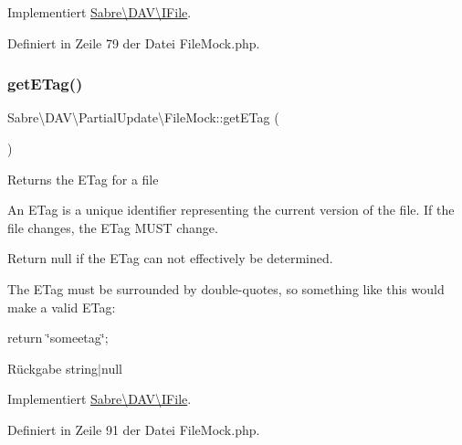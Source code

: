 Implementiert \mbox{\hyperlink{interface_sabre_1_1_d_a_v_1_1_i_file_aa76147e3e0ad228026dcb03035b499bc}{Sabre\textbackslash{}\+D\+A\+V\textbackslash{}\+I\+File}}.



Definiert in Zeile 79 der Datei File\+Mock.\+php.

\mbox{\label{class_sabre_1_1_d_a_v_1_1_partial_update_1_1_file_mock_ac3cb7c33686234052db8f3b870822cc9}} 
\subsubsection{\texorpdfstring{get\+E\+Tag()}{getETag()}}
{\footnotesize\ttfamily Sabre\textbackslash{}\+D\+A\+V\textbackslash{}\+Partial\+Update\textbackslash{}\+File\+Mock\+::get\+E\+Tag (\begin{DoxyParamCaption}{ }\end{DoxyParamCaption})}

Returns the E\+Tag for a file

An E\+Tag is a unique identifier representing the current version of the file. If the file changes, the E\+Tag M\+U\+ST change.

Return null if the E\+Tag can not effectively be determined.

The E\+Tag must be surrounded by double-\/quotes, so something like this would make a valid E\+Tag\+:

return \textquotesingle{}\char`\"{}someetag\char`\"{}\textquotesingle{};

\begin{DoxyReturn}{Rückgabe}
string$\vert$null 
\end{DoxyReturn}


Implementiert \mbox{\hyperlink{interface_sabre_1_1_d_a_v_1_1_i_file_a2b207a6037dcbd4e7373b977dc60117f}{Sabre\textbackslash{}\+D\+A\+V\textbackslash{}\+I\+File}}.



Definiert in Zeile 91 der Datei File\+Mock.\+php.

\mbox{\label{class_sabre_1_1_d_a_v_1_1_partial_update_1_1_file_mock_af20087b574c63fe429a5e4c730ef80c4}} 
